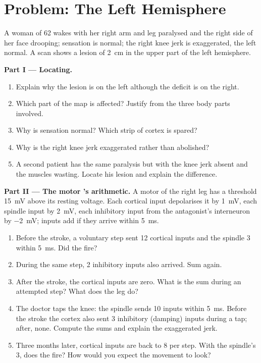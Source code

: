 \section{Problem: The Left Hemisphere}

\begin{problem}
\label{pb:g12:brain-and-movement:1}
A woman of 62 wakes with her right arm and leg paralysed and the right
side of her face drooping; sensation is normal; the right knee jerk
is exaggerated, the left normal. A scan shows a lesion of
\qty{2}{cm} in the upper part of the left hemisphere.

\medskip
\noindent\textbf{Part I --- Locating.}
\begin{enumerate}
  \item Explain why the lesion is on the left although the deficit is
        on the right.
  \item Which part of the map is affected? Justify from the three
        body parts involved.
  \item Why is sensation normal? Which strip of cortex is spared?
  \item Why is the right knee jerk exaggerated rather than abolished?
  \item A second patient has the same paralysis but with the knee jerk
        absent and the muscles wasting. Locate his lesion and explain
        the difference.
\end{enumerate}

\medskip
\noindent\textbf{Part II --- The motor 's arithmetic.}
A motor  of the right leg has a threshold \qty{15}{mV} above its
resting voltage. Each cortical input depolarises it by \qty{1}{mV},
each spindle input by \qty{2}{mV}, each inhibitory input from the
antagonist's interneuron by \qty{-2}{mV}; inputs add if they arrive
within \qty{5}{ms}.
\begin{enumerate}[resume]
  \item Before the stroke, a voluntary step sent 12 cortical inputs
        and the spindle 3 within \qty{5}{ms}. Did the  fire?
  \item During the same step, 2 inhibitory inputs also arrived. Sum
        again.
  \item After the stroke, the cortical inputs are zero. What is the
        sum during an attempted step? What does the leg do?
  \item The doctor taps the knee: the spindle sends 10 inputs within
        \qty{5}{ms}. Before the stroke the cortex also sent 3
        inhibitory (damping) inputs during a tap; after, none. Compute
        the sums and explain the exaggerated jerk.
  \item Three months later, cortical inputs are back to 8 per step.
        With the spindle's 3, does the  fire? How would you
        expect the movement to look?
\end{enumerate}


\end{problem}
